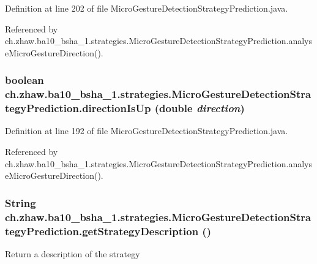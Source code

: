Definition at line 202 of file MicroGestureDetectionStrategyPrediction.java.

Referenced by ch.zhaw.ba10\_\-bsha\_\-1.strategies.MicroGestureDetectionStrategyPrediction.analyseMicroGestureDirection().\hypertarget{classch_1_1zhaw_1_1ba10__bsha__1_1_1strategies_1_1MicroGestureDetectionStrategyPrediction_a9f38c05408d59c4d2211b249a402e0ff}{
\subsubsection[{directionIsUp}]{\setlength{\rightskip}{0pt plus 5cm}boolean ch.zhaw.ba10\_\-bsha\_\-1.strategies.MicroGestureDetectionStrategyPrediction.directionIsUp (double {\em direction})}}
\label{classch_1_1zhaw_1_1ba10__bsha__1_1_1strategies_1_1MicroGestureDetectionStrategyPrediction_a9f38c05408d59c4d2211b249a402e0ff}


Definition at line 192 of file MicroGestureDetectionStrategyPrediction.java.

Referenced by ch.zhaw.ba10\_\-bsha\_\-1.strategies.MicroGestureDetectionStrategyPrediction.analyseMicroGestureDirection().\hypertarget{classch_1_1zhaw_1_1ba10__bsha__1_1_1strategies_1_1MicroGestureDetectionStrategyPrediction_af62bea565c797e4313d5150b7d6335ca}{
\subsubsection[{getStrategyDescription}]{\setlength{\rightskip}{0pt plus 5cm}String ch.zhaw.ba10\_\-bsha\_\-1.strategies.MicroGestureDetectionStrategyPrediction.getStrategyDescription ()}}
\label{classch_1_1zhaw_1_1ba10__bsha__1_1_1strategies_1_1MicroGestureDetectionStrategyPrediction_af62bea565c797e4313d5150b7d6335ca}
Return a description of the strategy

